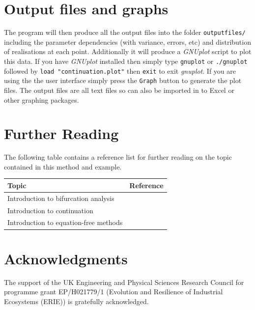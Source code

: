 \documentclass[11pt]{article}
\begin{document}
\section{Output files and graphs}
\label{sec:TERMINAL}
The program will then produce all the output files into the folder {\tt outputfiles/} including the parameter dependencies (with variance, errors, etc) and distribution of realisations at each point. Additionally it will produce a {\it GNUplot} script to plot this data. If you have {\it GNUplot} installed then simply type {\tt gnuplot} or {\tt ./gnuplot} followed by {\tt load "continuation.plot"} then {\tt exit} to exit {\it gnuplot}. If you are using the the user interface simply press the {\tt Graph} button to generate the plot files. The output files are all text files so can also be imported in to Excel or other graphing packages.

\section{Further Reading}

The following table contains a reference list for further reading on the topic contained in this method and example. 
\begin{center}
\begin{tabular}{|l|c|}
\hline
Topic									&	Reference \\ \hline
Introduction to bifurcation analysis		&	\cite{Meunier1988}	\\
Introduction to continuation 			&	\cite{Doedel1991,Allgower1990,Rheinboldt2000,Krauskopf2007} \\ 
Introduction to equation-free methods	&	\cite{Theodoropoulos2000,Kevrekidis2003,Kevrekidis2009}	\\
\hline
\end{tabular}
\end{center}



\section*{Acknowledgments}
{The support of the UK Engineering and Physical Sciences Research Council for programme grant EP/H021779/1 (Evolution and Resilience of Industrial Ecosystems (ERIE)) is gratefully acknowledged.}
 
\end{document}
